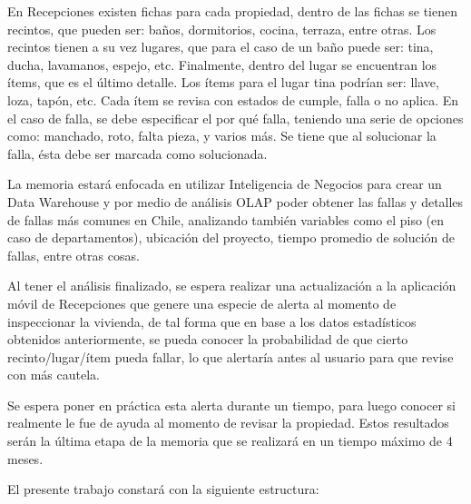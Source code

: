 \documentclass[letter,12pt,oneside]{report}
\begin{document}
En Recepciones existen fichas para cada propiedad, dentro de las fichas se tienen recintos, que pueden ser: baños, dormitorios, cocina, terraza, entre otras. Los recintos tienen a su vez lugares, que para el caso de un baño puede ser: tina, ducha, lavamanos, espejo, etc. Finalmente, dentro del lugar se encuentran los ítems, que es el último detalle. Los ítems para el lugar tina podrían ser: llave, loza, tapón, etc. Cada ítem se revisa con estados de cumple, falla o no aplica. En el caso de falla, se debe especificar el por qué falla, teniendo una serie de opciones como: manchado, roto, falta pieza, y varios más. Se tiene que al solucionar la falla, ésta debe ser marcada como solucionada.

La memoria estará enfocada en utilizar Inteligencia de Negocios para crear un Data Warehouse y por medio de análisis OLAP poder obtener las fallas y detalles de fallas más comunes en Chile, analizando también variables como el piso (en caso de departamentos), ubicación del proyecto, tiempo promedio de solución de fallas, entre otras cosas.

Al tener el análisis finalizado, se espera realizar una actualización a la aplicación móvil de Recepciones que genere una especie de alerta al momento de inspeccionar la vivienda, de tal forma que en base a los datos estadísticos obtenidos anteriormente, se pueda conocer la probabilidad de que cierto recinto/lugar/ítem pueda fallar, lo que alertaría antes al usuario para que revise con más cautela.

Se espera poner en práctica esta alerta durante un tiempo, para luego conocer si realmente le fue de ayuda al momento de revisar la propiedad. Estos resultados serán la última etapa de la memoria que se realizará en un tiempo máximo de 4 meses.

El presente trabajo constará con la siguiente estructura:
\end{document}
